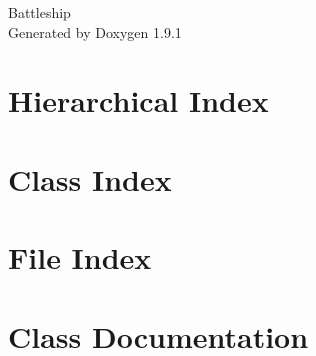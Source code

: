 \let\mypdfximage\pdfximage\def\pdfximage{\immediate\mypdfximage}\documentclass[twoside]{book}
\newcommand{\+}{\discretionary{\mbox{\scriptsize$\hookleftarrow$}}{}{}}
\newcommand{\clearemptydoublepage}{%
  \newpage{\pagestyle{empty}\cleardoublepage}%
}
\begin{document}
\raggedbottom

\hypersetup{pageanchor=false,
             bookmarksnumbered=true,
             pdfencoding=unicode
            }
\begin{titlepage}
\vspace*{7cm}
\begin{center}%
{\Large Battleship }\\
\vspace*{1cm}
{\large Generated by Doxygen 1.9.1}\\
\end{center}
\end{titlepage}
\clearemptydoublepage
{}
\tableofcontents
\clearemptydoublepage
{}
\hypersetup{pageanchor=true}

\chapter{Hierarchical Index}

\chapter{Class Index}

\chapter{File Index}

\chapter{Class Documentation}













































\end{document}
